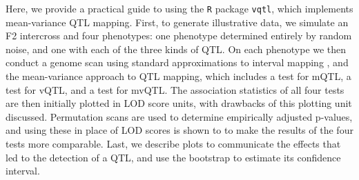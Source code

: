 \documentclass[9pt,twocolumn,twoside]{gsag3jnl}
\begin{document}
Here, we provide a practical guide to using the \texttt{R} package \texttt{vqtl}, which implements mean-variance QTL mapping.
First, to generate illustrative data, we simulate an F2 intercross and four phenotypes: one phenotype determined entirely by random noise, and one with each of the three kinds of QTL.
On each phenotype we then conduct a genome scan using standard approximations to interval mapping \citep{Lander1989a,Martinez1992}, and the mean-variance approach to QTL mapping, which includes a test for mQTL, a test for vQTL, and a test for mvQTL.
The association statistics of all four tests are then initially plotted in LOD score units, with drawbacks of this plotting unit discussed.
Permutation scans are used to determine empirically adjusted p-values, and using these in place of LOD scores is shown to to make the results of the four tests more comparable.
Last, we describe plots to communicate the effects that led to the detection of a QTL, and use the bootstrap to estimate its confidence interval.





\end{document}
